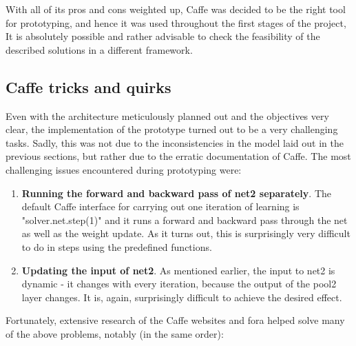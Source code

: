 \documentclass[a4paper, 12pt]{article}
\numberwithin{equation}{section}
\begin{document}
	With all of its pros and cons weighted up, Caffe was decided to be the right tool for prototyping, and hence it was used throughout the first stages of the project, It is absolutely possible and rather advisable to check the feasibility of the described solutions in a different framework.
	
	\subsection{Caffe tricks and quirks}
	
	Even with the architecture meticulously planned out and the objectives very clear, the implementation of the prototype turned out to be a very challenging tasks. Sadly, this was not due to the inconsistencies in the model laid out in the previous sections, but rather due to the erratic documentation of Caffe. The most challenging issues encountered during prototyping were:
	
	\begin{enumerate}
		\item \textbf{Running the forward and backward pass of net2 separately}. The default Caffe interface for carrying out one iteration of learning is "solver.net.step(1)" and it runs a forward and backward pass through the net as well as the weight update. As it turns out, this is surprisingly very difficult to do in steps using the predefined functions.
		\item \textbf{Updating the input of net2}. As mentioned earlier, the input to net2 is dynamic - it changes with every iteration, because the output of the pool2 layer changes. It is, again, surprisingly difficult to achieve the desired effect.
	\end{enumerate}
	
	Fortunately, extensive research of the Caffe websites and fora helped solve many of the above problems, notably (in the same order):
	
\end{document}

